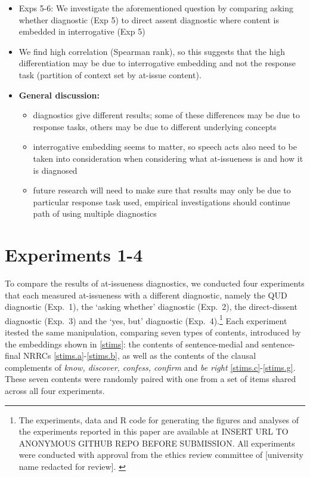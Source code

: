 \documentclass[times,linguex,xcolor]{glossa}
\begin{document}
\begin{itemize}[leftmargin=12pt]
  \item Exps 5-6: We investigate the aforementioned question by comparing asking whether diagnostic (Exp 5) to direct assent diagnostic where content is embedded in interrogative (Exp 5)

  \item We find high correlation (Spearman rank), so this suggests that the high differentiation may be due to interrogative embedding and not the response task (partition of context set by at-issue content). 

  \item {\bf General discussion:} 

  \begin{itemize}

  \item diagnostics give different results; some of these differences may be due to response tasks, others may be due to different underlying concepts

  \item interrogative embedding seems to matter, so speech acts also need to be taken into consideration when considering what at-issueness is and how it is diagnosed

  \item future research will need to make sure that results may only be due to particular response task used, empirical investigations should continue path of using multiple diagnostics 

  \end{itemize}

  \end{itemize}


    
  \newpage


\section{Experiments 1-4 \label{sec:2_experiments}}
    To compare the results of at-issueness diagnostics, we conducted four experiments that each measured at-issueness with a different diagnostic, namely the QUD diagnostic (Exp.~1), the `asking whether' diagnostic (Exp.~2), the direct-dissent diagnostic (Exp.~3) and the `yes, but' diagnostic (Exp.~4).\footnote{The experiments, data and R code for generating the figures and analyses of the experiments reported in this paper are available at INSERT URL TO ANONYMOUS GITHUB REPO BEFORE SUBMISSION. All experiments were conducted with approval from the ethics review committee of [university name redacted for review]. \label{f:github}}
    Each experiment itested the same manipulation, comparing seven types of contents, introduced by the embeddings shown in \ref{stims}: the contents of sentence-medial and sentence-final NRRCs \ref{stims.a}-\ref{stims.b}, as well as the contents of the clausal complements of \emph{know, discover, confess, confirm} and \emph{be right} \ref{stims.c}-\ref{stims.g}. These seven contents were randomly paired with one from a set of items shared across all four experiments.
\end{document}
